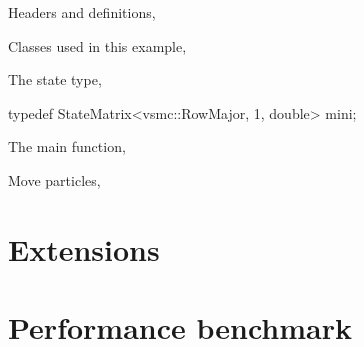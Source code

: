 Headers and definitions,


Classes used in this example,


The state type,
\begin{cppcode}
typedef StateMatrix<vsmc::RowMajor, 1, double> mini;
\end{cppcode}

The main function,


Move particles,


\section{Extensions}
\label{sec:Extensions}

\section{Performance benchmark}
\label{sec:Performance benchmark}

